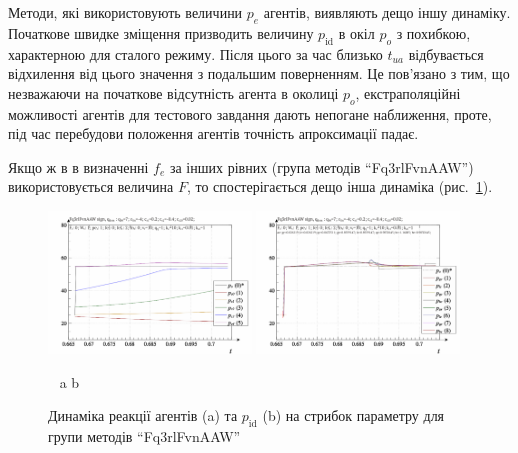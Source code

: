 Методи, які використовують величини
$p_e$ агентів, виявляють дещо іншу динаміку. Початкове швидке
зміщення призводить величину
$ p_\mathrm{id} $ в окіл
$ p_o $ з похибкою, характерною для сталого режиму. Після цього за
час близько
$ t_{ua} $ відбувається відхилення від цього значення з подальшим
поверненням. Це пов'язано з тим, що незважаючи на початкове
відсутність агента в околиці
$ p_o $, екстраполяційні можливості агентів для тестового завдання
дають непогане наближення, проте, під час перебудови положення
агентів точність апроксимації падає.


Якщо ж в в визначенні
$ f_e $ за інших рівних (група методів ``Fq3rlFvnAAW'') використовується
величина
$F$, то спостерігається дещо інша динаміка (рис.~\ref{atu:f:Fq3rlFvnAAW_sign}).

\begin{figure}[htb!]
  \begin{center}
    \includegraphics[width=0.48\textwidth]{p/sign/qls-p_t_pi_m_Fq3rlFvnAAW_sign.png}
    \hfill
    \includegraphics[width=0.48\textwidth]{p/sign/qls-p_t_p_m_Fq3rlFvnAAW_sign.png}
  \end{center}
  \vspace{-1.0ex}
  \begin{center}
    ~ \hfill a \hfill\hfill b  \hfill ~
  \end{center}
  \vspace{-1.5ex}
  \caption{Динаміка реакції агентів (a) та $p_\mathrm{id}$ (b) на стрибок параметру для групи методів ``Fq3rlFvnAAW''}
  \label{atu:f:Fq3rlFvnAAW_sign}
\end{figure}

